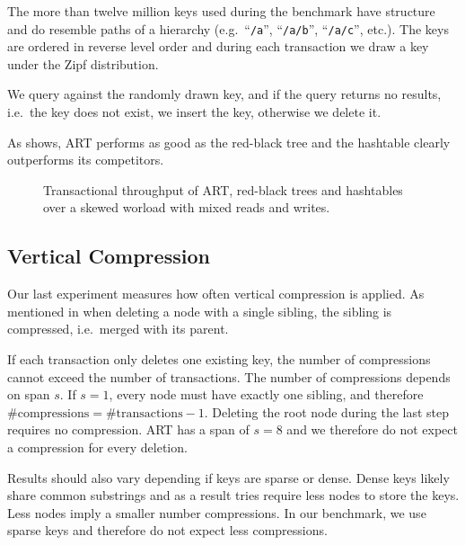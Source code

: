 \documentclass[abstracton,12pt]{scrartcl}
\theoremstyle{definition}
\begin{document}
The more than twelve million keys used during the benchmark have structure
and do resemble paths of a hierarchy (e.g.\ ``\texttt{/a}'', ``\texttt{/a/b}'',
``\texttt{/a/c}'', etc.). The keys are ordered in reverse level order and
during each transaction we draw a key under the Zipf distribution.

We query against the randomly drawn key, and if the query returns no results,
i.e.\ the key does not exist, we insert the key, otherwise we delete it.

As  shows, ART performs as good as the red-black tree and the
hashtable clearly outperforms its competitors.

\begin{figure}[H]
  \centering
  \caption{Transactional throughput of ART,
    red-black trees and hashtables over a skewed worload with
    mixed reads and writes.}
  \label{fig:main-benchmark}
\end{figure}

\subsection{Vertical Compression}
\label{sec:compression-benchmark}

Our last experiment measures how often vertical compression is applied.
As mentioned in  when deleting a node with
a single sibling, the sibling is compressed, i.e.\ merged with its parent.

If each transaction only deletes one existing key, the number of compressions
cannot exceed the number of transactions. The number of compressions
depends on span $s$. If $s=1$, every node must have exactly one sibling,
and therefore $\text{\#compressions}=\text{\#transactions}-1$. Deleting the
root node during the last step requires no compression. ART has a span of $s=8$
and we therefore do not expect a compression for every deletion.

Results should also vary depending if keys are sparse or dense. Dense keys
likely share common substrings and as a result tries require less nodes to 
store the keys. Less nodes imply a smaller number compressions. In our 
benchmark, we use sparse keys and therefore do not expect less compressions.
\end{document}
